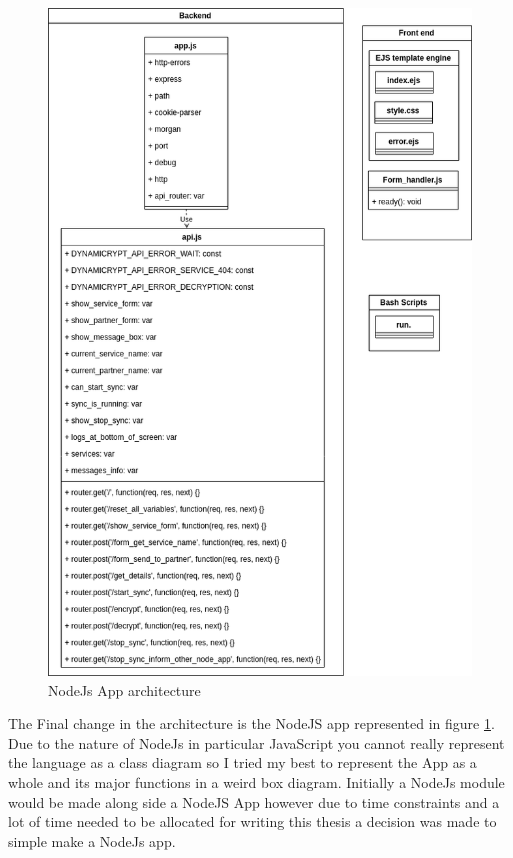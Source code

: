 \begin{figure}[!h]
  \centering
      \includegraphics[width=1\textwidth]{Figures/nodeJsApp.png}
  \caption[NodeJs App architecture]{NodeJs App architecture}
  \label{fig:nodeJsApp_architecture}
\end{figure}
\FloatBarrier

The Final change in the architecture is the NodeJS app represented in figure \ref{fig:nodeJsApp_architecture}. Due to the nature of NodeJs in particular JavaScript you cannot really represent the language as a class diagram so I tried my best to represent the App as a whole and its major functions in a weird box diagram. Initially a NodeJs module would be made along side a NodeJS App however due to time constraints and a lot of time needed to be allocated for writing this thesis a decision was made to simple make a NodeJs app. 

